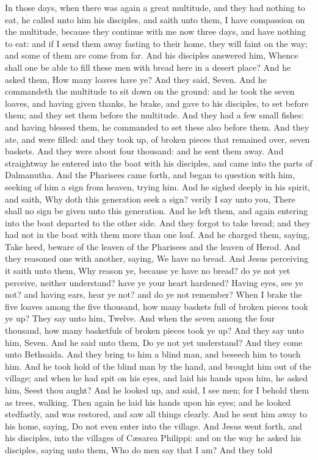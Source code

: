 In those days, when there was again a great multitude, and they had nothing to eat, he called unto him his disciples, and saith unto them, I have compassion on the multitude, because they continue with me now three days, and have nothing to eat: and if I send them away fasting to their home, they will faint on the way; and some of them are come from far. And his disciples answered him, Whence shall one be able to fill these men with bread here in a desert place? And he asked them, How many loaves have ye? And they said, Seven. And he commandeth the multitude to sit down on the ground: and he took the seven loaves, and having given thanks, he brake, and gave to his disciples, to set before them; and they set them before the multitude. And they had a few small fishes: and having blessed them, he commanded to set these also before them. And they ate, and were filled: and they took up, of broken pieces that remained over, seven baskets. And they were about four thousand: and he sent them away. And straightway he entered into the boat with his disciples, and came into the parts of Dalmanutha.  And the Pharisees came forth, and began to question with him, seeking of him a sign from heaven, trying him. And he sighed deeply in his spirit, and saith, Why doth this generation seek a sign? verily I say unto you, There shall no sign be given unto this generation. And he left them, and again entering into the boat departed to the other side.  And they forgot to take bread; and they had not in the boat with them more than one loaf. And he charged them, saying, Take heed, beware of the leaven of the Pharisees and the leaven of Herod. And they reasoned one with another, saying, We have no bread. And Jesus perceiving it saith unto them, Why reason ye, because ye have no bread? do ye not yet perceive, neither understand? have ye your heart hardened? Having eyes, see ye not? and having ears, hear ye not? and do ye not remember? When I brake the five loaves among the five thousand, how many baskets full of broken pieces took ye up? They say unto him, Twelve. And when the seven among the four thousand, how many basketfuls of broken pieces took ye up? And they say unto him, Seven. And he said unto them, Do ye not yet understand?  And they come unto Bethsaida. And they bring to him a blind man, and beseech him to touch him. And he took hold of the blind man by the hand, and brought him out of the village; and when he had spit on his eyes, and laid his hands upon him, he asked him, Seest thou aught? And he looked up, and said, I see men; for I behold them as trees, walking. Then again he laid his hands upon his eyes; and he looked stedfastly, and was restored, and saw all things clearly. And he sent him away to his home, saying, Do not even enter into the village.  And Jesus went forth, and his disciples, into the villages of Cæsarea Philippi: and on the way he asked his disciples, saying unto them, Who do men say that I am? And they told 